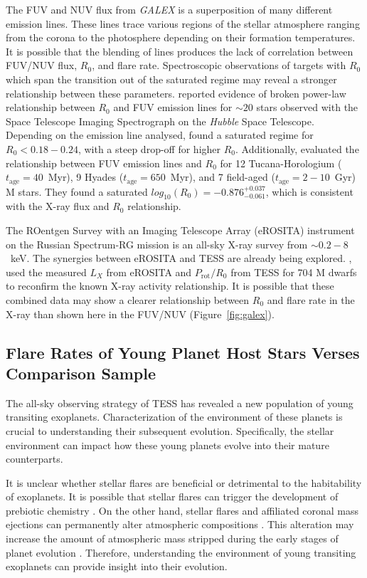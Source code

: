 \documentclass[twocolumn, linenumbers]{aastex631}
\begin{document}
The FUV and NUV flux from \textit{GALEX} is a superposition of many different emission lines. These lines  trace various regions of the stellar atmosphere ranging from the corona to the
photosphere depending on their formation temperatures. It is possible that the blending of lines produces the lack of correlation between FUV/NUV flux, $R_0$, and flare rate. Spectroscopic
observations of targets with $R_0$ which span the transition out of the saturated regime may reveal a stronger relationship between these parameters. \cite{pineda21} reported evidence of broken
power-law relationship between $R_0$ and FUV emission lines for $\sim 20$ stars observed with the Space Telescope Imaging Spectrograph on the \textit{Hubble} Space Telescope. Depending on the
emission line analysed, \cite{pineda21} found a saturated regime for $R_0 < 0.18 - 0.24$, with a steep drop-off for higher $R_0$. Additionally, \cite{loyd21} evaluated the relationship between
FUV emission lines and $R_0$ for 12  Tucana-Horologium ($t_\textrm{age} = 40$~Myr), 9 Hyades  ($t_\textrm{age} = 650$~Myr), and 7 field-aged ($t_\textrm{age} = 2-10$~Gyr) M stars. They found a
saturated $log_{10}(R_0) = -0.876_{-0.061}^{+0.037}$, which is consistent with the X-ray flux and $R_0$ relationship.

The ROentgen Survey with an Imaging Telescope Array (eROSITA) instrument \citep{predehl07, predehl21} on the Russian Spectrum-RG mission is an all-sky X-ray survey from $\sim 0.2-8$~keV. The
synergies between eROSITA and TESS are already being explored. \cite{magaudda22}, used the measured $L_X$ from eROSITA and $P_\textrm{rot}/R_0$ from TESS for 704 M dwarfs to reconfirm the known
X-ray activity relationship. It is possible that these combined data may show a  clearer relationship between $R_0$ and flare rate in the X-ray than shown here  in the FUV/NUV (Figure~\ref{fig:galex}).

\subsection{Flare Rates of Young Planet Host Stars Verses Comparison Sample}

The all-sky observing strategy of TESS has revealed a new population of young transiting exoplanets.  Characterization of the  environment of these planets is crucial to understanding their
subsequent evolution. Specifically, the stellar environment can impact how these young planets evolve into their mature counterparts.

It is unclear whether stellar flares are beneficial or detrimental to the habitability of exoplanets. It is possible that stellar flares can trigger the development of prebiotic chemistry
\citep{Rugheimer2015,airapetian16,Ranjan2017,Rimmer2018}. On the other hand, stellar flares and affiliated coronal mass ejections can permanently alter atmospheric compositions \citep{chen21}.
This alteration may increase the amount of atmospheric mass stripped during the early stages of planet evolution \citep{feinstein20}. Therefore,  understanding the environment of young
transiting exoplanets can  provide insight into their evolution.
\end{document}
